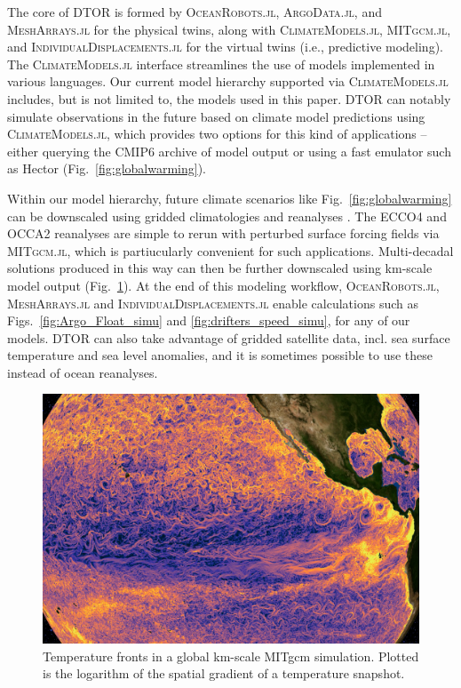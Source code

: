 \documentclass{juliacon}[12pt]
\newcommand{\pkg}[1]{{\small \textsc{#1}}}
\begin{document}
The core of DTOR is formed by \pkg{OceanRobots.jl}, \pkg{ArgoData.jl}, and \pkg{MeshArrays.jl} for the physical twins, along with \pkg{ClimateModels.jl}, \pkg{MITgcm.jl}, and \pkg{IndividualDisplacements.jl} for the virtual twins (i.e., predictive modeling). The \pkg{ClimateModels.jl} interface streamlines the use of models implemented in various languages. Our current model hierarchy supported via \pkg{ClimateModels.jl} includes, but is not limited to, the models used in this paper. DTOR can notably simulate observations in the future based on climate model predictions using \pkg{ClimateModels.jl}, which provides two options for this kind of applications -- either querying the CMIP6 archive of model output \cite{CMIP6} or using a fast emulator such as Hector \cite{Hector2015} (Fig.~\ref{fig:globalwarming}). 

Within our model hierarchy, future climate scenarios like Fig.~\ref{fig:globalwarming} can be downscaled using gridded climatologies and reanalyses \cite{Forget2010,Forget2015a,Forget2024a}. The ECCO4 and OCCA2 reanalyses are simple to rerun with perturbed surface forcing fields via \pkg{MITgcm.jl}, which is partiucularly convenient for such applications. Multi-decadal solutions produced in this way can then be further downscaled using km-scale model output (Fig.~\ref{fig:km_scale}). At the end of this modeling workflow, \pkg{OceanRobots.jl}, \pkg{MeshArrays.jl} and \pkg{IndividualDisplacements.jl} enable calculations such as Figs.~\ref{fig:Argo_Float_simu} and \ref{fig:drifters_speed_simu}, for any of our models. DTOR can also take advantage of gridded satellite data, incl. sea surface temperature and sea level anomalies, and it is sometimes possible to use these instead of ocean reanalyses.

\begin{figure}[th]
\centerline{\includegraphics[width=\columnwidth]{figs/Snapshot_grad_theta.png}}
\caption{Temperature fronts in a global km-scale MITgcm simulation. Plotted is the logarithm of the spatial gradient of a temperature snapshot.}
\label{fig:km_scale}
\end{figure}
\end{document}
